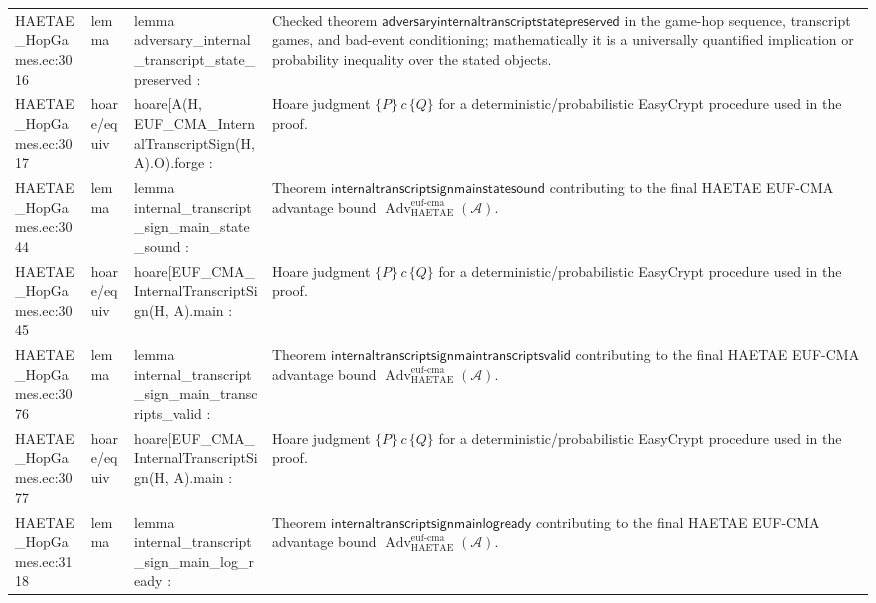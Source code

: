 \documentclass[10pt]{article}
\newcommand{\Adv}{\operatorname{Adv}}
\begin{document}
\begin{longtable}{L{0.11\textwidth}L{0.055\textwidth}L{0.385\textwidth}L{0.41\textwidth}}
HAETAE\_\allowbreak{}HopGames.\allowbreak{}ec:\allowbreak{}3016 & lemma & {\ttfamily\scriptsize lemma adversary\_\allowbreak{}internal\_\allowbreak{}transcript\_\allowbreak{}state\_\allowbreak{}preserved :} & Checked theorem $\mathsf{adversaryinternaltranscriptstatepreserved}$ in the game-hop sequence, transcript games, and bad-event conditioning; mathematically it is a universally quantified implication or probability inequality over the stated objects. \\
HAETAE\_\allowbreak{}HopGames.\allowbreak{}ec:\allowbreak{}3017 & hoare/equiv & {\ttfamily\scriptsize hoare[A(H, EUF\_\allowbreak{}CMA\_\allowbreak{}InternalTranscriptSign(H, A).O).forge :} & Hoare judgment $\{P\}\,c\,\{Q\}$ for a deterministic/probabilistic EasyCrypt procedure used in the proof. \\
HAETAE\_\allowbreak{}HopGames.\allowbreak{}ec:\allowbreak{}3044 & lemma & {\ttfamily\scriptsize lemma internal\_\allowbreak{}transcript\_\allowbreak{}sign\_\allowbreak{}main\_\allowbreak{}state\_\allowbreak{}sound :} & Theorem $\mathsf{internaltranscriptsignmainstatesound}$ contributing to the final HAETAE EUF-CMA advantage bound $\Adv_{\mathrm{HAETAE}}^{\mathrm{euf\mbox{-}cma}}(\mathcal A)$. \\
HAETAE\_\allowbreak{}HopGames.\allowbreak{}ec:\allowbreak{}3045 & hoare/equiv & {\ttfamily\scriptsize hoare[EUF\_\allowbreak{}CMA\_\allowbreak{}InternalTranscriptSign(H, A).main :} & Hoare judgment $\{P\}\,c\,\{Q\}$ for a deterministic/probabilistic EasyCrypt procedure used in the proof. \\
HAETAE\_\allowbreak{}HopGames.\allowbreak{}ec:\allowbreak{}3076 & lemma & {\ttfamily\scriptsize lemma internal\_\allowbreak{}transcript\_\allowbreak{}sign\_\allowbreak{}main\_\allowbreak{}transcripts\_\allowbreak{}valid :} & Theorem $\mathsf{internaltranscriptsignmaintranscriptsvalid}$ contributing to the final HAETAE EUF-CMA advantage bound $\Adv_{\mathrm{HAETAE}}^{\mathrm{euf\mbox{-}cma}}(\mathcal A)$. \\
HAETAE\_\allowbreak{}HopGames.\allowbreak{}ec:\allowbreak{}3077 & hoare/equiv & {\ttfamily\scriptsize hoare[EUF\_\allowbreak{}CMA\_\allowbreak{}InternalTranscriptSign(H, A).main :} & Hoare judgment $\{P\}\,c\,\{Q\}$ for a deterministic/probabilistic EasyCrypt procedure used in the proof. \\
HAETAE\_\allowbreak{}HopGames.\allowbreak{}ec:\allowbreak{}3118 & lemma & {\ttfamily\scriptsize lemma internal\_\allowbreak{}transcript\_\allowbreak{}sign\_\allowbreak{}main\_\allowbreak{}log\_\allowbreak{}ready :} & Theorem $\mathsf{internaltranscriptsignmainlogready}$ contributing to the final HAETAE EUF-CMA advantage bound $\Adv_{\mathrm{HAETAE}}^{\mathrm{euf\mbox{-}cma}}(\mathcal A)$. \\

\end{longtable}
\end{document}
